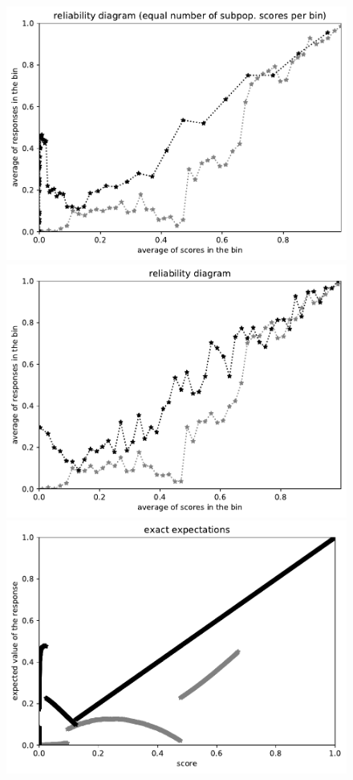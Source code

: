 \documentclass{article}
\newlength{\vertsep}
\newlength{\imsize}
\begin{document}
\begin{figure}
\begin{centering}
\parbox{\imsize}{\includegraphics[width=\imsize]
{../codes/unweighted/10000_7000_50_1/equisamps.pdf}}
\quad\quad
\parbox{\imsize}{\includegraphics[width=\imsize]
{../codes/unweighted/10000_7000_50_1/equiscore.pdf}}

\vspace{\vertsep}

\parbox{\imsize}{\includegraphics[width=\imsize]
{../codes/unweighted/10000_7000_10_1/exact.pdf}}


\end{centering}
\end{figure}
\end{document}
